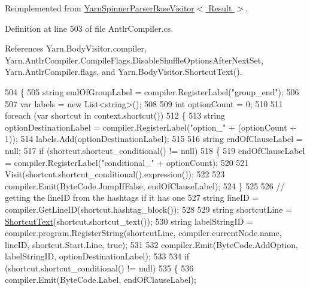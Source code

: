 Reimplemented from \hyperlink{a00197_a8299d25bc796f9c126635cf72aa3ea12}{Yarn\-Spinner\-Parser\-Base\-Visitor$<$ Result $>$}.



Definition at line 503 of file Antlr\-Compiler.\-cs.



References Yarn.\-Body\-Visitor.\-compiler, Yarn.\-Antlr\-Compiler.\-Compile\-Flags.\-Disable\-Shuffle\-Options\-After\-Next\-Set, Yarn.\-Antlr\-Compiler.\-flags, and Yarn.\-Body\-Visitor.\-Shortcut\-Text().


\begin{DoxyCode}
504         \{
505             \textcolor{keywordtype}{string} endOfGroupLabel = compiler.RegisterLabel(\textcolor{stringliteral}{"group\_end"});
506 
507             var labels = \textcolor{keyword}{new} List<string>();
508 
509             \textcolor{keywordtype}{int} optionCount = 0;
510 
511             \textcolor{keywordflow}{foreach} (var shortcut \textcolor{keywordflow}{in} context.shortcut())
512             \{
513                 \textcolor{keywordtype}{string} optionDestinationLabel = compiler.RegisterLabel(\textcolor{stringliteral}{"option\_"} + (optionCount + 1));
514                 labels.Add(optionDestinationLabel);
515 
516                 \textcolor{keywordtype}{string} endOfClauseLabel = null;
517                 \textcolor{keywordflow}{if} (shortcut.shortcut\_conditional() != null)
518                 \{
519                     endOfClauseLabel = compiler.RegisterLabel(\textcolor{stringliteral}{"conditional\_"} + optionCount);
520 
521                     Visit(shortcut.shortcut\_conditional().expression());
522 
523                     compiler.Emit(ByteCode.JumpIfFalse, endOfClauseLabel);
524                 \}
525 
526                 \textcolor{comment}{// getting the lineID from the hashtags if it has one}
527                 \textcolor{keywordtype}{string} lineID = compiler.GetLineID(shortcut.hashtag\_block());
528 
529                 \textcolor{keywordtype}{string} shortcutLine = \hyperlink{a00044_ad8448dacbbd94adebf38c29c3f50e499}{ShortcutText}(shortcut.shortcut\_text());
530                 \textcolor{keywordtype}{string} labelStringID = compiler.program.RegisterString(shortcutLine, 
      compiler.currentNode.name, lineID, shortcut.Start.Line, \textcolor{keyword}{true});
531 
532                 compiler.Emit(ByteCode.AddOption, labelStringID, optionDestinationLabel);
533 
534                 \textcolor{keywordflow}{if} (shortcut.shortcut\_conditional() != null)
535                 \{
536                     compiler.Emit(ByteCode.Label, endOfClauseLabel);

\end{DoxyCode}
